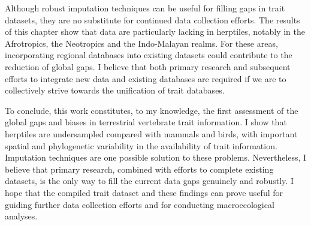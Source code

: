 
Although robust imputation techniques can be useful for filling gaps in trait datasets, they are no substitute for continued data collection efforts. The results of this chapter show that data are particularly lacking in herptiles, notably in the Afrotropics, the Neotropics and the Indo-Malayan realms. For these areas, incorporating regional databases into existing datasets could contribute to the reduction of global gaps. I believe that both primary research and subsequent efforts to integrate new data and existing databases are required if we are to collectively strive towards the unification of trait databases.

To conclude, this work constitutes, to my knowledge, the first assessment of the global gaps and biases in terrestrial vertebrate trait information. I show that herptiles are undersampled compared with mammals and birds, with important spatial and phylogenetic variability in the availability of trait information. Imputation techniques are one possible solution to these problems. Nevertheless, I believe that primary research, combined with efforts to complete existing datasets, is the only way to fill the current data gaps genuinely and robustly. I hope that the compiled trait dataset and these findings can prove useful for guiding further data collection efforts and for conducting macroecological analyses.

